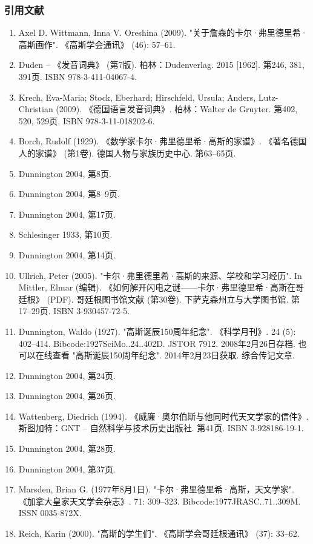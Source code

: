 \subsubsection{引用文献}  
\begin{enumerate}
\item Axel D. Wittmann, Inna V. Oreshina (2009). "关于詹森的卡尔·弗里德里希·高斯画作". 《高斯学会通讯》 (46): 57–61.  
\item Duden – 《发音词典》 (第7版). 柏林：Dudenverlag. 2015 [1962]. 第246, 381, 391页. ISBN 978-3-411-04067-4.  
\item Krech, Eva-Maria; Stock, Eberhard; Hirschfeld, Ursula; Anders, Lutz-Christian (2009). 《德国语言发音词典》. 柏林：Walter de Gruyter. 第402, 520, 529页. ISBN 978-3-11-018202-6.  
\item Borch, Rudolf (1929). 《数学家卡尔·弗里德里希·高斯的家谱》. 《著名德国人的家谱》 (第1卷). 德国人物与家族历史中心. 第63–65页.  
\item Dunnington 2004, 第8页.  
\item Dunnington 2004, 第8–9页.  
\item Dunnington 2004, 第17页.  
\item Schlesinger 1933, 第10页.  
\item Dunnington 2004, 第14页.  
\item Ullrich, Peter (2005). "卡尔·弗里德里希·高斯的来源、学校和学习经历". In Mittler, Elmar (编辑). 《如何解开闪电之谜——卡尔·弗里德里希·高斯在哥廷根》 (PDF). 哥廷根图书馆文献 (第30卷). 下萨克森州立与大学图书馆. 第17–29页. ISBN 3-930457-72-5.  
\item Dunnington, Waldo (1927). "高斯诞辰150周年纪念". 《科学月刊》. 24 (5): 402–414. Bibcode:1927SciMo..24..402D. JSTOR 7912. 2008年2月26日存档. 也可以在线查看 "高斯诞辰150周年纪念". 2014年2月23日获取. 综合传记文章.  
\item Dunnington 2004, 第24页.  
\item Dunnington 2004, 第26页.  
\item Wattenberg, Diedrich (1994). 《威廉·奥尔伯斯与他同时代天文学家的信件》. 斯图加特：GNT – 自然科学与技术历史出版社. 第41页. ISBN 3-928186-19-1.  
\item Dunnington 2004, 第28页.  
\item Dunnington 2004, 第37页.  
\item Marsden, Brian G. (1977年8月1日). "卡尔·弗里德里希·高斯，天文学家". 《加拿大皇家天文学会杂志》. 71: 309–323. Bibcode:1977JRASC..71..309M. ISSN 0035-872X.  
\item Reich, Karin (2000). "高斯的学生们". 《高斯学会哥廷根通讯》 (37): 33–62.  

\end{enumerate}
